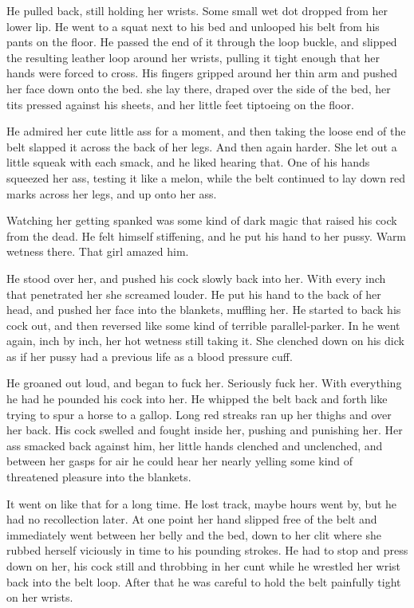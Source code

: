 \documentclass[letterpaper]{article}
\begin{document}
He pulled back, still holding her wrists. Some small wet dot dropped from her lower lip.
He went to a squat next to his bed and unlooped his belt from his pants on the floor.
He passed the end of it through the loop buckle, and slipped the resulting leather loop around her wrists, pulling it tight enough that her hands were forced to cross.
His fingers gripped around her thin arm and pushed her face down onto the bed.
she lay there, draped over the side of the bed, her tits pressed against his sheets, and her little feet tiptoeing on the floor.

He admired her cute little ass for a moment, and then taking the loose end of the belt slapped it across the back of her legs. And then again harder. She let out a little squeak with each smack, and he liked hearing that.
One of his hands squeezed her ass, testing it like a melon, while the belt continued to lay down red marks across her legs, and up onto her ass.

Watching her getting spanked was some kind of dark magic that raised his cock from the dead.
He felt himself stiffening, and he put his hand to her pussy.
Warm wetness there. That girl amazed him.

He stood over her, and pushed his cock slowly back into her.
With every inch that penetrated her she screamed louder.
He put his hand to the back of her head, and pushed her face into the blankets, muffling her.
He started to back his cock out, and then reversed like some kind of terrible parallel-parker.
In he went again, inch by inch, her hot wetness still taking it.
She clenched down on his dick as if her pussy had a previous life as a blood pressure cuff.

He groaned out loud, and began to fuck her. Seriously fuck her.
With everything he had he pounded his cock into her. 
He whipped the belt back and forth like trying to spur a horse to a gallop. Long red streaks ran up her thighs and over her back. His cock swelled and fought inside her, pushing and punishing her.
Her ass smacked back against him, her little hands clenched and unclenched, and between her gasps for air he could hear her nearly yelling some kind of threatened pleasure into the blankets.

It went on like that for a long time. He lost track, maybe hours went by, but he had no recollection later. At one point her hand slipped free of the belt and immediately went between her belly and the bed, down to her clit where she rubbed herself viciously in time to his pounding strokes. 
He had to stop and press down on her, his cock still and throbbing in her cunt while he wrestled her wrist back into the belt loop. 
After that he was careful to hold the belt painfully tight on her wrists.
\end{document}
